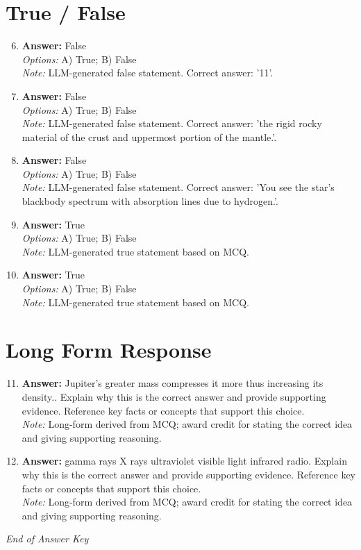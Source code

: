\documentclass[12pt]{article}
\begin{document}
\section*{True / False}
\begin{enumerate}[label=\arabic*.]
\setcounter{enumi}{5}
\item \textbf{Answer:} False
\\ \textit{Options:} A) True; B) False
\\ \textit{Note:} LLM-generated false statement. Correct answer: '11'.
\item \textbf{Answer:} False
\\ \textit{Options:} A) True; B) False
\\ \textit{Note:} LLM-generated false statement. Correct answer: 'the rigid rocky material of the crust and uppermost portion of the mantle.'.
\item \textbf{Answer:} False
\\ \textit{Options:} A) True; B) False
\\ \textit{Note:} LLM-generated false statement. Correct answer: 'You see the star's blackbody spectrum with absorption lines due to hydrogen.'.
\item \textbf{Answer:} True
\\ \textit{Options:} A) True; B) False
\\ \textit{Note:} LLM-generated true statement based on MCQ.
\item \textbf{Answer:} True
\\ \textit{Options:} A) True; B) False
\\ \textit{Note:} LLM-generated true statement based on MCQ.
\end{enumerate}

\section*{Long Form Response}
\begin{enumerate}[label=\arabic*.]
\setcounter{enumi}{10}
\item \textbf{Answer:} Jupiter's greater mass compresses it more thus increasing its density.. Explain why this is the correct answer and provide supporting evidence. Reference key facts or concepts that support this choice.
\\ \textit{Note:} Long-form derived from MCQ; award credit for stating the correct idea and giving supporting reasoning.
\item \textbf{Answer:} gamma rays X rays ultraviolet visible light infrared radio. Explain why this is the correct answer and provide supporting evidence. Reference key facts or concepts that support this choice.
\\ \textit{Note:} Long-form derived from MCQ; award credit for stating the correct idea and giving supporting reasoning.
\end{enumerate}

\vfill
\noindent\textit{End of Answer Key}
\end{document}
